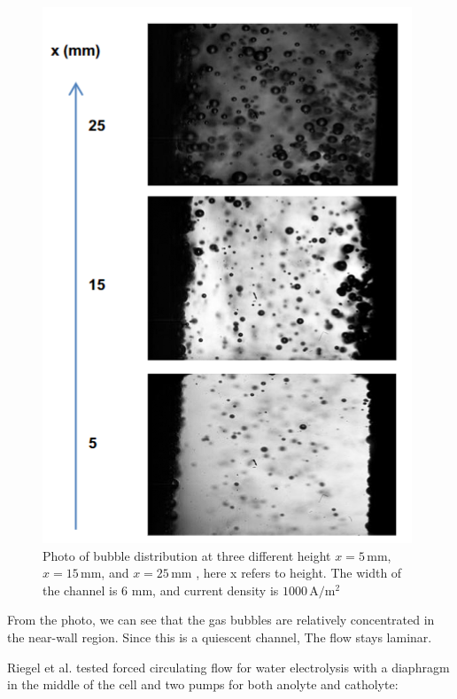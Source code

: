 \begin{figure}[H]
    \centering
    \includegraphics[scale=0.7]{bubblephoto.png}
    \caption{Photo of bubble distribution at three different height $x = 5 \, \mathrm{mm}$, $x = 15 \, \mathrm{mm}$, and $x = 25 \, \mathrm{mm}$ \cite{abdelouahed2014hydrodynamics}, here x refers to height. The width of the channel is 6 mm, and current density is $1000 \, \mathrm{A/m^2}$}
    \label{bubblephoto}
\end{figure}

From the photo, we can see that the gas bubbles are relatively concentrated in the near-wall region. Since this is a quiescent channel, The flow stays laminar.

Riegel et al. \cite{riegel1998role} tested forced circulating flow for water electrolysis with a diaphragm in the middle of the cell and two pumps for both anolyte and catholyte:

